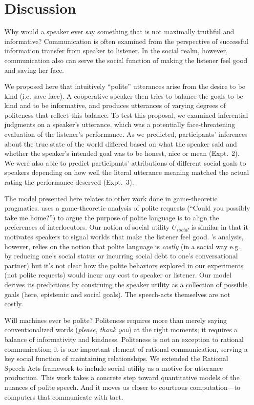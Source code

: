 \documentclass[10pt,letterpaper]{article}
\begin{document}
\section{Discussion}

Why would a speaker ever say something that is not maximally truthful and informative?
Communication is often examined from the perspective of successful information transfer from speaker to listener.
In the social realm, however, communication also can serve the social function of making the listener feel good and saving her face.

We proposed here that intuitively ``polite'' utterances arise from the desire to be kind (i.e. save face). 
A cooperative speaker then tries to balance the goals to be kind and to be informative, and produces utterances of varying degrees of politeness that reflect this balance.
To test this proposal, we examined inferential judgments on a speaker's utterance, which was a potentially face-threatening evaluation of the listener's performance.
As we predicted, participants' inferences about the true state of the world differed based on what the speaker said and whether the speaker's intended goal was to be honest, nice or mean (Expt.~2).
We were also able to predict participants' attributions of different social goals to speakers depending on
how well the literal utterance meaning matched the actual rating the performance deserved (Expt.~3).

The model presented here relates to other work done in game-theoretic pragmatics.
 uses a game-theoretic analysis of polite requests (``Could you possibly take me home?'') to argue the purpose of polite language is to align the preferences of interlocutors. 
Our notion of social utility $U_{social}$ is similar in that it motivates speakers to signal worlds that make the listener feel good. 
\citeauthor{VanRooy2003}'s analysis, however, relies on the notion that polite language is \emph{costly} (in a social way e.g., by reducing one's social status or incurring social debt to one's conversational partner) but it's not clear how the polite behaviors explored in our experiments (not polite requests) would incur any cost to speaker or listener. 
Our model derives its predictions by construing the speaker utility as a collection of possible goals (here, epistemic and social goals). The speech-acts themselves are not costly. 



Will machines ever be polite?
Politeness requires more than merely saying conventionalized words (\emph{please}, \emph{thank you}) at the right moments; it requires a balance of informativity and kindness.
Politeness is not an exception to rational communication; it is one important element of rational communication, serving a key social function of maintaining relationships.
We extended the Rational Speech Acts framework to include social utility as a motive for utterance production.
This work takes a concrete step toward quantitative models of the nuances of polite speech.
And it moves us closer to courteous computation---to computers that communicate with tact.
\end{document}
